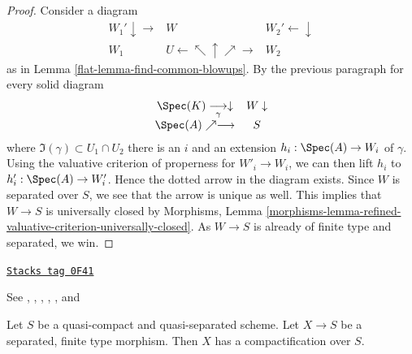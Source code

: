 \begin{proof}
\medskip\noindent
Consider a diagram
$$
\begin{array}{ccc}W_1' \downarrow\longrightarrow & W & W_2' \longleftarrow\downarrow \\ W_1 & U \longleftarrow\nwarrow\uparrow\nearrow\longrightarrow & W_2\end{array}
$$
as in Lemma \ref{flat-lemma-find-common-blowups}. By the previous paragraph
for every solid diagram
$$
\begin{array}{cc}\Spec(K) \underset{\gamma}{\longrightarrow}\downarrow & W \downarrow \\ \Spec(A) \nearrow\longrightarrow & S\end{array}
$$
where $\Im(\gamma) \subset U_1 \cap U_2$ there is an $i$ and
an extension $h_i : \Spec(A) \to W_i$ of $\gamma$.
Using the valuative criterion of properness for $W'_i \to W_i$,
we can then lift $h_i$ to $h'_i : \Spec(A) \to W'_i$.
Hence the dotted arrow in the diagram exists. Since $W$
is separated over $S$, we see that the arrow is unique as well.
This implies that $W \to S$ is universally closed by
Morphisms, Lemma
\ref{morphisms-lemma-refined-valuative-criterion-universally-closed}.
As $W \to S$ is already of finite type and separated, we win.
\end{proof}

\begin{theorem}[Nagata]
\label{flat-theorem-nagata}
\href{https://stacks.math.columbia.edu/tag/0F41}{\texttt{Stacks tag 0F41}}

\begin{reference}
See \cite{Lutkebohmert}, \cite{Conrad-Nagata}, \cite{Nagata-1},
\cite{Nagata-2}, \cite{Nagata-3}, and \cite{Nagata-4}
\end{reference}
Let $S$ be a quasi-compact and quasi-separated scheme. Let
$X \to S$ be a separated, finite type morphism.
Then $X$ has a compactification over $S$.
\end{theorem}

